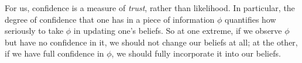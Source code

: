 %
%
%
For us, confidence is a measure of \emph{trust}, rather than likelihood.
In particular, the {degree of confidence} that one has in a piece of information $\phi$
quantifies how seriously to take $\phi$ in updating one's beliefs. 
%
%
So at one extreme,
if we observe $\phi$ but have no confidence in it, 
we should not change our beliefs at all;
at the other, if we have full confidence in $\phi$,
 we should fully incorporate it into our beliefs.
 
